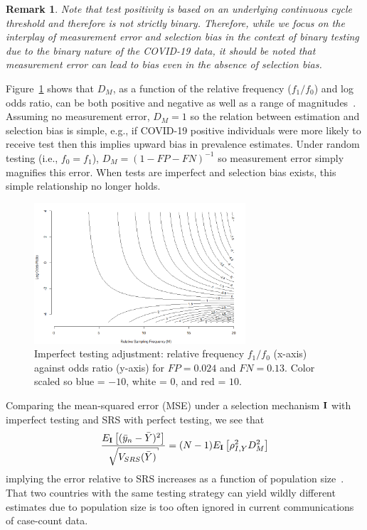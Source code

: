 \documentclass[11pt]{amsart}
\numberwithin{equation}{section}
\theoremstyle{plain}
\newtheorem{remark}{Remark}
\def\I{\bf I}
\begin{document}
 \begin{remark}
 \label{rmk:testbinary}
 Note that test positivity is based on an underlying continuous cycle threshold and therefore is not strictly binary.  Therefore, while we focus on the interplay of measurement error and selection bias in the context of binary testing due to the binary nature of the COVID-19 data, it should be noted that measurement error can lead to bias even in the absence of selection bias.
 \end{remark}

 Figure~\ref{fig:heatmap} shows that $D_M$, as a function of the relative frequency ($f_1/f_0$) and log odds ratio, can be both positive and negative as well as a range of magnitudes~\citep{Beesley2020,Beesley2019,Smeden2019}. Assuming no measurement error, $D_M = 1$ so the relation between estimation and selection bias is simple, e.g., if COVID-19 positive individuals were more likely to receive test then this implies upward bias in prevalence estimates. Under random testing (i.e., $f_0 = f_1$), $D_M = (1-FP-FN)^{-1}$ so measurement error simply magnifies this error. When tests are imperfect and selection bias exists, this simple relationship no longer holds.

 \begin{figure}[!th]
 \centering
 \includegraphics[width = 0.7\textwidth]{../figs/mem_heatmap.png}
 \caption{Imperfect testing adjustment: relative frequency $f_1/f_0$ (x-axis) against odds ratio (y-axis) for $FP=0.024$ and $FN=0.13$. Color scaled so blue = $-10$, white = $0$, and red = $10$.}
 \label{fig:heatmap}
 \vspace{-0.3cm}
 \end{figure}

 Comparing the mean-squared error (MSE) under a selection mechanism $\I$ with imperfect testing and SRS with perfect testing, we see that
 $$
 \frac{E_{\I} \left[ (\bar y_n - \bar Y)^2 \right]}{\sqrt{V_{SRS} (\bar Y)}} = (N-1) E_{\I} \left[ \rho_{I,Y}^2 D_M^2 \right]
 $$
 implying the error relative to SRS increases as a function of population size~\citep{Meng2018}. That two countries with the same testing strategy can yield wildly different estimates due to population size is too often ignored in current communications of case-count data.
\end{document}
